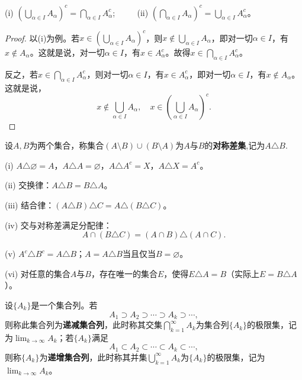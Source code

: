 \documentclass[../../main.tex]{subfiles}
\begin{document}
\begin{theorem}[De Morgan法则]\label{theorem:De Morgan法则}
  (i) \(\left(\bigcup_{\alpha\in I}A_{\alpha}\right)^c=\bigcap_{\alpha\in I}A_{\alpha}^c\); $\quad \quad$
(ii) \(\left(\bigcap_{\alpha\in I}A_{\alpha}\right)^c=\bigcup_{\alpha\in I}A_{\alpha}^c\)。  
\end{theorem}
\begin{proof}
  以(i)为例。若\(x\in\left(\bigcup_{\alpha\in I}A_{\alpha}\right)^c\)，则\(x\notin\bigcup_{\alpha\in I}A_{\alpha}\)，即对一切\(\alpha\in I\)，有\(x\notin A_{\alpha}\)。这就是说，对一切\(\alpha\in I\)，有\(x\in A_{\alpha}^c\)。故得\(x\in\bigcap_{\alpha\in I}A_{\alpha}^c\)。

反之，若\(x\in\bigcap_{\alpha\in I}A_{\alpha}^c\)，则对一切\(\alpha\in I\)，有\(x\in A_{\alpha}^c\)，即对一切\(\alpha\in I\)，有\(x\notin A_{\alpha}\)。这就是说，
\[x\notin\bigcup_{\alpha\in I}A_{\alpha}, \quad x\in\left(\bigcup_{\alpha\in I}A_{\alpha}\right)^c.\]
\end{proof}

\begin{definition}[集合的对称差]\label{definition:集合的对称差}
  设\(A,B\)为两个集合，称集合\((A\setminus B)\cup(B\setminus A)\)为\(A\)与\(B\)的\textbf{对称差集},记为\(A\triangle B\).
\end{definition}

\begin{proposition}[集合的对称差的基本性质]\label{proposition:集合的对称差的基本性质}
  (i) \(A\triangle\varnothing = A\)，\(A\triangle A=\varnothing\)，\(A\triangle A^c = X\)，\(A\triangle X = A^c\)。

(ii) 交换律：\(A\triangle B = B\triangle A\)。

(iii) 结合律：\((A\triangle B)\triangle C = A\triangle(B\triangle C)\)。

(iv) 交与对称差满足分配律：
\[A\cap(B\triangle C)=(A\cap B)\triangle(A\cap C).\]

(v) \(A^c\triangle B^c = A\triangle B\)；\(A = A\triangle B\)当且仅当\(B = \varnothing\)。

(vi) 对任意的集合\(A\)与\(B\)，存在唯一的集合\(E\)，使得\(E\triangle A = B\)（实际上\(E = B\triangle A\)）。
\end{proposition}

\begin{definition}[递增、递减集合列]\label{definition:递增、递减集合列}
设\(\{A_k\}\)是一个集合列。若
\[A_1\supset A_2\supset\cdots\supset A_k\supset\cdots,\]
则称此集合列为\textbf{递减集合列}，此时称其交集\(\bigcap_{k = 1}^{\infty}A_k\)为集合列\(\{A_k\}\)的极限集，记为\(\lim_{k\rightarrow\infty}A_k\)；若\(\{A_k\}\)满足
\[A_1\subset A_2\subset\cdots\subset A_k\subset\cdots,\]
则称\(\{A_k\}\)为\textbf{递增集合列}，此时称其并集\(\bigcup_{k = 1}^{\infty}A_k\)为\(\{A_k\}\)的极限集，记为\(\lim_{k\rightarrow\infty}A_k\)。
\end{definition}
\end{document}
